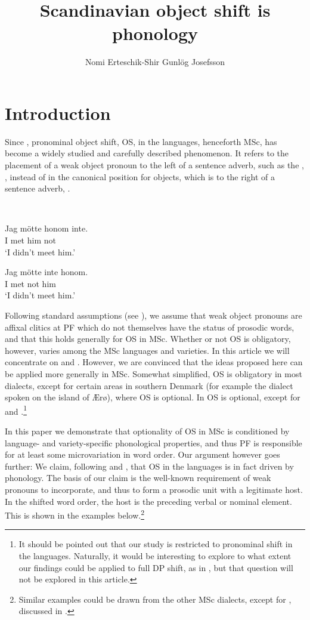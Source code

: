\documentclass[output=paper]{LSP/langsci}
\author{Nomi Erteschik-Shir	\affiliation{Ben Gurion University}\lastand 
	Gunlög Josefsson\affiliation{Lund University}
}
\title{Scandinavian object shift is phonology}
\begin{document}
\section{Introduction} 
Since \citealt{Holmberg1986}, pronominal object shift, OS, in the  languages, henceforth MSc, has become a widely studied and carefully described phenomenon. It refers to the placement of a weak object pronoun to the left of a sentence adverb, such as the , , instead of in the canonical position for objects, which is to the right of a sentence adverb, .  

\noindent\parbox{\textwidth}{\ea {}\\%
    \label{ex:erteschik:1}
\ea  \label{ex:erteschik:1a}

    \gll Jag   mötte   honom   inte.\\
	   I    met    him    not\\
    \glt      ‘I didn’t meet him.’

\ex  \label{ex:erteschik:1b}
\gll Jag   mötte   inte   honom.   \\
    I    met    not  him\\
\glt
       ‘I didn’t meet him.’
\z
\z}

Following standard assumptions (see \citealt{Selkirk1996}), we assume that weak object pronouns are affixal clitics at PF which do not themselves have the status of prosodic words, and that this holds generally for OS in MSc. Whether or not OS is obligatory, however, varies among the MSc languages and varieties. In this article we will concentrate on  and . However, we are convinced that the ideas proposed here can be applied more generally in MSc. Somewhat simplified, OS is obligatory in most  dialects, except for certain areas in southern Denmark (for example the dialect spoken on the {island} of Ærø), where OS is optional. In  OS is optional, except for  and  .\footnote{It should be pointed out that our study is restricted to pronominal shift in the  languages. Naturally, it  would be interesting to explore to what extent our findings could be applied to full DP shift, as in , but that {question} will not be explored in this article.} 

In this paper we demonstrate that optionality of OS in MSc is conditioned by language- and variety-specific phonological properties, and thus PF is responsible for at least some microvariation in word order. Our argument however goes further: We claim, following  \citealt{Erteschik-Shir2005Sound} and \citealt{Josefsson2010,Josefsson2012}, that OS in the  languages is in fact driven by phonology. The basis of our claim is the well-known requirement of weak pronouns to incorporate, and thus to form a prosodic unit with a legitimate host. In the shifted word order, the host is the preceding verbal or nominal element. This is shown in the  examples below.\footnote{Similar examples could be drawn from the other MSc dialects, except for , discussed in .}
\end{document}
